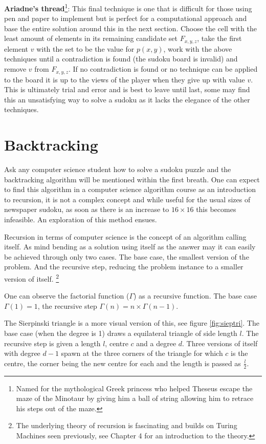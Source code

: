 \documentclass[a4paper,11pt]{report}
\begin{document}
\textbf{Ariadne's thread}\footnote{Named for the mythological Greek princess who helped Theseus escape the maze of the Minotaur by giving him a ball of string allowing him to retrace his steps out of the maze.}: This final technique is one that is difficult for those using pen and paper to implement but is perfect for a computational approach and base the entire solution around this in the next section. Choose the cell with the least amount of elements in its remaining candidate set $F_{x,y,z}$, take the first element $v$ with the set to be the value for $p(x,y)$, work with the above techniques until a contradiction is found (the sudoku board is invalid) and remove $v$ from $F_{x,y,z}$. If no contradiction is found or no technique can be applied to the board it is up to the views of the player when they give up with value $v$. This is ultimately trial and error and is best to leave until last, some may find this an unsatisfying way to solve a sudoku as it lacks the elegance of the other techniques. 

\section{Backtracking}

Ask any computer science student how to solve a sudoku puzzle and the backtracking algorithm will be mentioned within the first breath. One can expect to find this algorithm in a computer science algorithm course as an introduction to recursion, it is not a complex concept and while useful for the usual sizes of newspaper sudoku, as soon as there is an increase to $16 \times 16$ this becomes infeasible. An exploration of this method ensues.

Recursion in terms of computer science is the concept of an algorithm calling itself. As mind bending as a solution using itself as the answer may it can easily be achieved through only two cases. The base case, the smallest version of the problem. And the recursive step, reducing the problem instance to a smaller version of itself. \footnote{The underlying theory of recursion is fascinating and builds on Turing Machines seen previously, see \cite{salomaa1985computation} Chapter 4 for an introduction to the theory.}

One can observe the factorial function ($\Gamma$) as a recursive function. The base case $\Gamma(1)=1$, the recursive step $\Gamma(n)=n\times \Gamma(n-1)$.

The Sierpinski triangle is a more visual version of this, see figure \ref{fig:sieptri}. The base case (when the degree is 1) draws a equilateral triangle of side length $l$. The recursive step is given a length $l$, centre $c$ and a degree $d$. Three versions of itself with degree $d-1$ spawn at the three corners of the triangle for which $c$ is the centre, the corner being the new centre for each and the length is passed as $\frac{l}{2}$.
\end{document}
